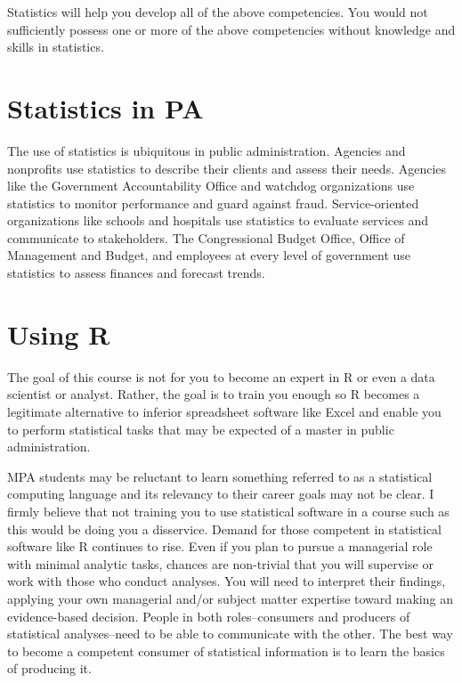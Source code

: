 \documentclass[
]{book}
\begin{document}
Statistics will help you develop all of the above competencies. You would not sufficiently possess one or more of the above competencies without knowledge and skills in statistics.

\hypertarget{statistics-in-pa}{%
\section{Statistics in PA}\label{statistics-in-pa}}

The use of statistics is ubiquitous in public administration. Agencies and nonprofits use statistics to describe their clients and assess their needs. Agencies like the Government Accountability Office and watchdog organizations use statistics to monitor performance and guard against fraud. Service-oriented organizations like schools and hospitals use statistics to evaluate services and communicate to stakeholders. The Congressional Budget Office, Office of Management and Budget, and employees at every level of government use statistics to assess finances and forecast trends.

\hypertarget{using-r}{%
\section{Using R}\label{using-r}}

The goal of this course is not for you to become an expert in R or even a data scientist or analyst. Rather, the goal is to train you enough so R becomes a legitimate alternative to inferior spreadsheet software like Excel and enable you to perform statistical tasks that may be expected of a master in public administration.

MPA students may be reluctant to learn something referred to as a statistical computing language and its relevancy to their career goals may not be clear. I firmly believe that not training you to use statistical software in a course such as this would be doing you a disservice. Demand for those competent in statistical software like R continues to rise. Even if you plan to pursue a managerial role with minimal analytic tasks, chances are non-trivial that you will supervise or work with those who conduct analyses. You will need to interpret their findings, applying your own managerial and/or subject matter expertise toward making an evidence-based decision. People in both roles--consumers and producers of statistical analyses--need to be able to communicate with the other. The best way to become a competent consumer of statistical information is to learn the basics of producing it.
\end{document}
